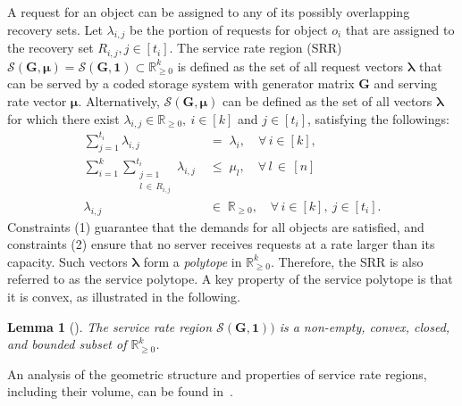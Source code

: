 \documentclass[conference,letterpaper]{IEEEtran}
\newtheorem{lemma}{Lemma}
\begin{document}
A request for an object can be assigned to any of its possibly overlapping recovery sets. Let $\lambda_{i,j}$ be the portion of requests for object $o_i$ that are assigned to the recovery set $R_{i,j}, j \in [t_i]$. The service rate region (SRR) $\mathcal{S}(\boldsymbol{G}, \boldsymbol{\mu}) = \mathcal{S}(\boldsymbol{G}, \boldsymbol{1}) \subset \mathbb{R}_{\ge0}^k$ is defined as the set of all request vectors $\boldsymbol{\lambda}$ that can be served by a coded storage system with generator matrix $\boldsymbol{G}$ and serving rate vector $\boldsymbol{\mu}$. Alternatively, $\mathcal{S}(\boldsymbol{G}, \boldsymbol{\mu})$ can be defined as the set of all vectors $\boldsymbol{\lambda}$ for which there exist $\lambda_{i,j} \in \mathbb{R}_{\ge 0},\ i \in [k]$ and $j \in [t_i]$, satisfying the followings:
\begin{align}
        \sum_{j=1}^{t_i}\lambda_{i, j} & \;=\; \lambda_i, \quad \forall\, i \in [k],\\   
        \sum_{i=1}^{k}\sum_{\substack{j=1 \\ l\, \in\, R_{i, j}}}^{t_i}\lambda_{i, j} &\;\le\; \mu_{l}, \quad \forall\, l\, \in\, [n]\\
        \lambda_{i, j} &\;\in\; \mathbb{R}_{\ge 0}, \quad \forall\, i \in [k],\ j \in [t_i].
\end{align}
Constraints (1) guarantee that the demands for all objects are satisfied, and constraints (2) ensure that no server receives requests at a rate larger than its capacity. Such vectors $\boldsymbol{\lambda}$ form a \textit{polytope} in $\mathbb{R}_{\ge 0}^k$. Therefore, the SRR is also referred to as the service polytope. A key property of the service polytope is that it is convex, as illustrated in the following.
\begin{lemma}
[]\label{lem:convexity}
The service rate region $\mathcal{S}(\boldsymbol{G}, \boldsymbol{1}))$ is a non-empty, convex, closed, and bounded subset of $\mathbb{R}_{\ge 0}^k$.
\end{lemma}
An analysis of the geometric structure and properties of service rate regions, including their volume, can be found in~\cite{Service:journals/siaga/AlfaranoKRS24}.
\end{document}
